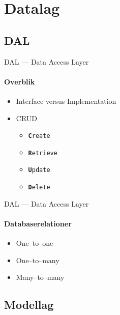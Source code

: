 \section{Datalag}

\subsection{DAL}

\begin{frame}{DAL --- Data Access Layer}
  \framesubtitle{Overblik}
  \begin{itemize}
    \item Interface versus Implementation
    \item CRUD
    \begin{itemize}
      \item \texttt{\textbf{C}reate}
      \item \texttt{\textbf{R}etrieve}
      \item \texttt{\textbf{U}pdate}
      \item \texttt{\textbf{D}elete}
    \end{itemize}
  \end{itemize}
\end{frame}

\begin{frame}{DAL --- Data Access Layer}
  \framesubtitle{Databaserelationer}
  \begin{itemize}
    \item One--to--one
    \item One--to--many
    \item Many--to--many
  \end{itemize}
\end{frame}


\subsection{Modellag}

